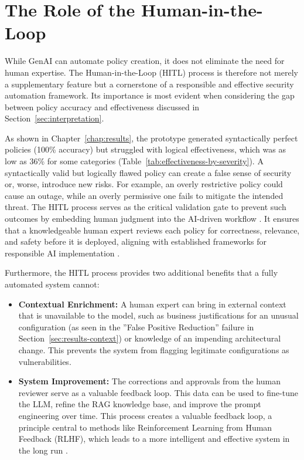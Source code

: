 \section{The Role of the Human-in-the-Loop}
\label{sec:hitl_in_action}

While GenAI can automate policy creation, it does not eliminate the need for human expertise. The Human-in-the-Loop (HITL) process is therefore not merely a supplementary feature but a cornerstone of a responsible and effective security automation framework. Its importance is most evident when considering the gap between policy accuracy and effectiveness discussed in Section~\ref{sec:interpretation}.

As shown in Chapter~\ref{chap:results}, the prototype generated syntactically perfect policies (100\% accuracy) but struggled with logical effectiveness, which was as low as 36\% for some categories (Table~\ref{tab:effectiveness-by-severity}). A syntactically valid but logically flawed policy can create a false sense of security or, worse, introduce new risks. For example, an overly restrictive policy could cause an outage, while an overly permissive one fails to mitigate the intended threat. The HITL process serves as the critical validation gate to prevent such outcomes by embedding human judgment into the AI-driven workflow \cite{mohsin_unified_2024}. It ensures that a knowledgeable human expert reviews each policy for correctness, relevance, and safety before it is deployed, aligning with established frameworks for responsible AI implementation \cite{ibm_what_2025}.

Furthermore, the HITL process provides two additional benefits that a fully automated system cannot:
\begin{itemize}
    \item \textbf{Contextual Enrichment:} A human expert can bring in external context that is unavailable to the model, such as business justifications for an unusual configuration (as seen in the ''False Positive Reduction'' failure in Section~\ref{sec:results-context}) or knowledge of an impending architectural change. This prevents the system from flagging legitimate configurations as vulnerabilities.
    \item \textbf{System Improvement:} The corrections and approvals from the human reviewer serve as a valuable feedback loop. This data can be used to fine-tune the LLM, refine the RAG knowledge base, and improve the prompt engineering over time. This process creates a valuable feedback loop, a principle central to methods like Reinforcement Learning from Human Feedback (RLHF), which leads to a more intelligent and effective system in the long run \cite{ouyang_training_2022}.
\end{itemize}

